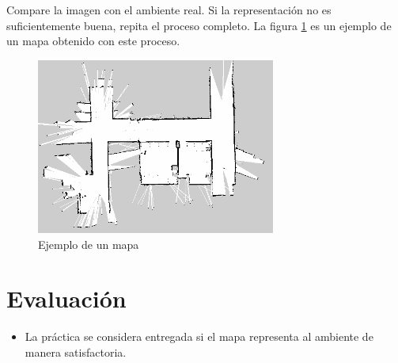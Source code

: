 \documentclass[letterpaper,12pt]{article}
\begin{document}
Compare la imagen con el ambiente real. Si la representación no es suficientemente buena, repita el proceso completo. La figura \ref{fig:mapa} es un ejemplo de un mapa obtenido con este proceso. 

\begin{figure}
\centering
\includegraphics[width=0.7\textwidth]{Figures/map.png}
\caption{Ejemplo de un mapa}
\label{fig:mapa}
\end{figure}


\section{Evaluación}
\begin{itemize}
\item La práctica se considera entregada si el mapa representa al ambiente de manera satisfactoria. 
\end{itemize}
\end{document}
